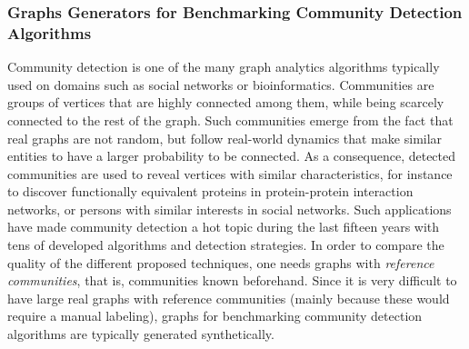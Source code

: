 \subsubsection{Graphs Generators for Benchmarking Community Detection Algorithms}
\label{sec:generators_community_detection}

Community detection is one of the many graph analytics algorithms typically used on domains such as social networks or bioinformatics. Communities are groups of vertices that are highly connected among them, while being scarcely connected to the rest of the graph. Such communities emerge from the fact that real graphs are not random, but follow real-world dynamics that make similar entities to have a larger probability to be connected. As a consequence, detected communities are used to reveal vertices with similar characteristics, for instance to discover functionally equivalent proteins in protein-protein interaction networks, or persons with similar interests in social networks. Such applications have made community detection a hot topic during the last fifteen years with tens of developed algorithms and detection strategies. In order to compare the quality of the different proposed techniques, one needs graphs with \emph{reference communities}, that is, communities known beforehand. Since it is very difficult to have large real graphs with reference communities (mainly because these would require a manual labeling), graphs for benchmarking community detection algorithms are typically generated synthetically.

